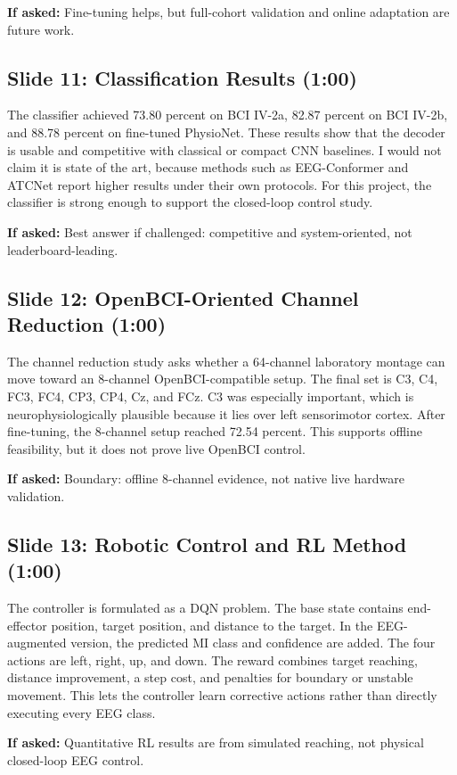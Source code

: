 \documentclass[11pt]{article}
\begin{document}
\textbf{If asked:} Fine-tuning helps, but full-cohort validation and online adaptation are future work.

\subsection*{Slide 11: Classification Results (1:00)}
The classifier achieved 73.80 percent on BCI IV-2a, 82.87 percent on BCI IV-2b, and 88.78 percent on fine-tuned PhysioNet. These results show that the decoder is usable and competitive with classical or compact CNN baselines. I would not claim it is state of the art, because methods such as EEG-Conformer and ATCNet report higher results under their own protocols. For this project, the classifier is strong enough to support the closed-loop control study.


\textbf{If asked:} Best answer if challenged: competitive and system-oriented, not leaderboard-leading.

\subsection*{Slide 12: OpenBCI-Oriented Channel Reduction (1:00)}
The channel reduction study asks whether a 64-channel laboratory montage can move toward an 8-channel OpenBCI-compatible setup. The final set is C3, C4, FC3, FC4, CP3, CP4, Cz, and FCz. C3 was especially important, which is neurophysiologically plausible because it lies over left sensorimotor cortex. After fine-tuning, the 8-channel setup reached 72.54 percent. This supports offline feasibility, but it does not prove live OpenBCI control.


\textbf{If asked:} Boundary: offline 8-channel evidence, not native live hardware validation.

\subsection*{Slide 13: Robotic Control and RL Method (1:00)}
The controller is formulated as a DQN problem. The base state contains end-effector position, target position, and distance to the target. In the EEG-augmented version, the predicted MI class and confidence are added. The four actions are left, right, up, and down. The reward combines target reaching, distance improvement, a step cost, and penalties for boundary or unstable movement. This lets the controller learn corrective actions rather than directly executing every EEG class.


\textbf{If asked:} Quantitative RL results are from simulated reaching, not physical closed-loop EEG control.
\end{document}
